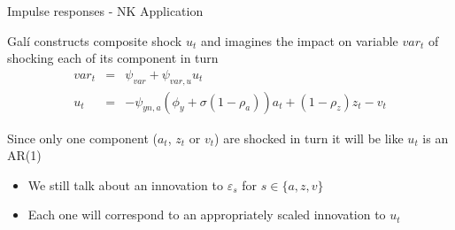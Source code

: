 \documentclass{beamer}
\begin{document}

	
\begin{frame}{Impulse responses - NK Application}

Gal\'i constructs composite shock $u_{t}$ and imagines the impact on variable $var_{t}$ of shocking each of its component in turn
\begin{eqnarray*}
var_{t} 		&=& \psi_{var}  + \psi_{var,u} u_{t} \\
u_{t}		&=& -\psi_{yn,a}\left( \phi_{y} + \sigma(1-\rho_{a}) \right)a_{t} + (1-\rho_{z})z_{t} - v_{t}
\end{eqnarray*}

\vspace{2mm}
Since only one component ($a_{t}$, $z_{t}$ or $v_{t}$) are shocked in turn it will be like $u_{t}$ is an AR(1)
\begin{itemize}
\item	We still talk about an innovation to $\varepsilon_{s}$ for $s \in\{a,z,v\}$
\item	Each one will correspond to an appropriately scaled innovation to $u_{t}$
\end{itemize}

\end{frame}

%
%	
%
%
%
\end{document}
